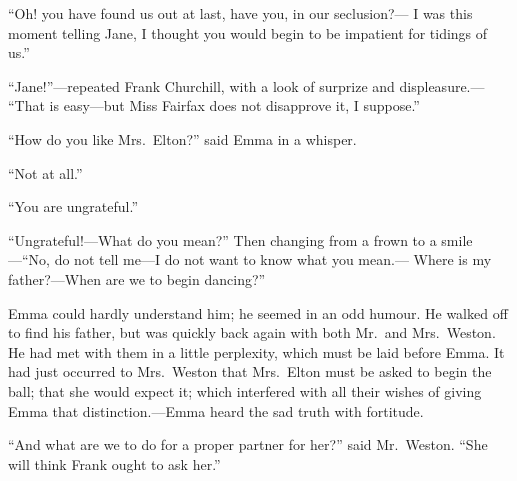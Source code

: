 ``Oh! you have found us out at last, have you, in our seclusion?---%
I was this moment telling Jane, I thought you would begin to be
impatient for tidings of us.''

``Jane!''---repeated Frank Churchill, with a look of surprize and displeasure.---%
``That is easy---but Miss Fairfax does not disapprove it, I suppose.''

``How do you like Mrs.\ Elton?'' said Emma in a whisper.

``Not at all.''

``You are ungrateful.''

``Ungrateful!---What do you mean?''  Then changing from a frown to
a smile---``No, do not tell me---I do not want to know what you mean.---%
Where is my father?---When are we to begin dancing?''

Emma could hardly understand him; he seemed in an odd humour.
He walked off to find his father, but was quickly back again with both
Mr.\ and Mrs.\ Weston.  He had met with them in a little perplexity,
which must be laid before Emma.  It had just occurred to Mrs.\ Weston
that Mrs.\ Elton must be asked to begin the ball; that she would
expect it; which interfered with all their wishes of giving Emma
that distinction.---Emma heard the sad truth with fortitude.

``And what are we to do for a proper partner for her?'' said Mr.\ Weston.
``She will think Frank ought to ask her.''

